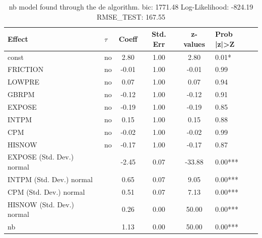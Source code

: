 \begin{table}
	\caption{nb model found through the de algorithm. bic: 1771.48 Log-Likelihood: -824.19 RMSE_TEST: 167.55}
	\begin{center}
		\begin{tabular}{|l|l|c|c|c|l|}
			\hline
			Effect & $\tau$ & Coeff & Std. Err & z-values & Prob |z|>Z \\
			\hline
			const & no & 2.80 & 1.00 & 2.80 & 0.01* \\
			\hline
			FRICTION & no & -0.01 & 1.00 & -0.01 & 0.99 \\
			\hline
			LOWPRE & no & 0.07 & 1.00 & 0.07 & 0.94 \\
			\hline
			GBRPM & no & -0.12 & 1.00 & -0.12 & 0.91 \\
			\hline
			EXPOSE & no & -0.19 & 1.00 & -0.19 & 0.85 \\
			\hline
			INTPM & no & 0.15 & 1.00 & 0.15 & 0.88 \\
			\hline
			CPM & no & -0.02 & 1.00 & -0.02 & 0.99 \\
			\hline
			HISNOW & no & -0.17 & 1.00 & -0.17 & 0.87 \\
			\hline
			EXPOSE (Std. Dev.) normal &  & -2.45 & 0.07 & -33.88 & 0.00*** \\
			\hline
			INTPM (Std. Dev.) normal &  & 0.65 & 0.07 & 9.05 & 0.00*** \\
			\hline
			CPM (Std. Dev.) normal &  & 0.51 & 0.07 & 7.13 & 0.00*** \\
			\hline
			HISNOW (Std. Dev.) normal &  & 0.26 & 0.00 & 50.00 & 0.00*** \\
			\hline
			nb &  & 1.13 & 0.00 & 50.00 & 0.00*** \\
			\hline
		\end{tabular}
	\end{center}
\end{table}